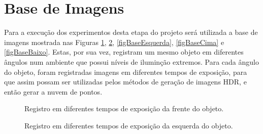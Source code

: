 \section{Base de Imagens} \label{pontosBaseImg}

Para a execução dos experimentos desta etapa do projeto será utilizada a base de imagens mostrada nas Figuras \ref{figBaseFrente}, \ref{figBaseDireita}, \ref{figBaseEsquerda}, \ref{figBaseCima} e \ref{figBaseBaixo}. Estas, por sua vez, registram um mesmo objeto em diferentes ângulos num ambiente que possui níveis de iluminção extremos. Para cada ângulo do objeto, foram registradas imagens em diferentes tempos de exposição, para que assim possam ser utilizadas pelos métodos de geração de imagens HDR, e então gerar a nuvem de pontos.

\begin{figure}[H]
  \centering 
  \quad %
  \quad %
  \quad %
  \caption{Registro em diferentes tempos de exposição da frente do objeto.}
  \label{figBaseFrente}
\end{figure}

\begin{figure}[H]
  \centering 
  \quad %
  \quad %
  \quad %
  \caption{Registro em diferentes tempos de exposição da esquerda do objeto.}
  \label{figBaseDireita}
\end{figure}

